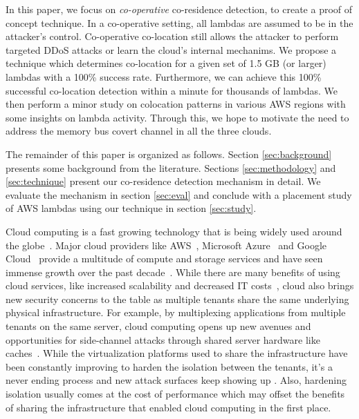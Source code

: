 In this paper, we focus on \emph{co-operative} co-residence detection, to
create a proof of concept technique.  In a co-operative setting, all lambdas
are assumed to be in the attacker's control.  Co-operative co-location still allows the attacker to perform
targeted DDoS attacks  or learn the cloud's internal
mechanims. We propose a technique which determines co-location for a given set
of 1.5 GB (or larger) lambdas with a 100\% success rate.  Furthermore, we can
achieve this 100\% successful co-location detection within a minute for
thousands of lambdas. We then perform a minor study on colocation patterns in
various AWS regions with some insights on lambda activity.  Through this, we hope to motivate the need to address the
memory bus covert channel in all the three clouds.


The remainder of this paper is organized as follows. Section
\ref{sec:background} presents some background from the literature. Sections
\ref{sec:methodology} and \ref{sec:technique} present our co-residence detection
mechanism in detail. We evaluate the mechanism in section \ref{sec:eval} and
conclude with a placement study of AWS lambdas using our technique in section
\ref{sec:study}.  

Cloud computing is a fast growing technology that is being widely used 
around the globe~. Major cloud providers like AWS~\cite{awscloud}, 
Microsoft Azure~\cite{azurecloud} and Google Cloud~\cite{googlecloud} 
provide a multitude of compute and storage services and have seen 
immense growth over the past decade~. While there are many 
benefits of using cloud services, like increased scalability and 
decreased IT costs~\cite{Armbrust}, cloud also brings new security 
concerns to the table as multiple tenants share the same underlying 
physical infrastructure. 
For example, by multiplexing applications from multiple tenants on 
the same server, cloud computing opens up new avenues and opportunities 
for side-channel attacks through shared server hardware like 
caches~\cite{meltdown, xuccsw2011}. While the virtualization platforms 
used to share the infrastructure have been constantly improving to harden 
the isolation between the tenants, it's a never ending process and new 
attack surfaces keep showing up . Also, hardening isolation 
usually comes 
at the cost of performance which may offset the benefits of sharing 
the infrastructure that enabled cloud computing in the first place.



